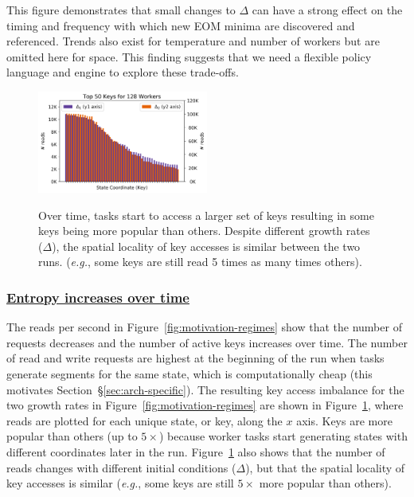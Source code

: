 This figure demonstrates that small changes to \(\Delta\) can have a strong
effect on the timing and frequency with which new EOM minima are discovered and
referenced.  Trends also exist for temperature and number of workers but are
omitted here for space.  This finding suggests that we need a flexible policy
language and engine to explore these trade-offs.  

\begin{figure}[t]
  \noindent\includegraphics[width=0.5\textwidth]{figures/methodology-keys.png}\\
  \caption{Over time, tasks start to access a larger set of keys resulting in
some keys being more popular than others.  Despite different growth rates
(\(\Delta\)), the spatial locality of key accesses is similar between the two
runs.  ({\it e.g.}, some keys are still read 5 times as many times others).
\label{fig:methodology-keys}}
\end{figure}

\subsubsection{\underline{Entropy increases over time}} The reads per second in
Figure~\ref{fig:motivation-regimes} show that the number of requests decreases
and the number of active keys increases over time.  The number of read and
write requests are highest at the beginning of the run when tasks generate
segments for the same state, which is computationally cheap (this motivates
Section~\S\ref{sec:arch-specific}).  The resulting key access imbalance for the
two growth rates in Figure~\ref{fig:motivation-regimes} are shown in
Figure~\ref{fig:methodology-keys}, where reads are plotted for each unique
state, or key, along the \(x\) axis. Keys are more popular than others (up to
\(5\times\)) because worker tasks start generating states with different
coordinates later in the run.  Figure~\ref{fig:methodology-keys} also shows that the
number of reads changes with different initial conditions (\(\Delta\)), but
that the spatial locality of key accesses is similar ({\it e.g.}, some keys are
still \(5\times\) more popular than others).
